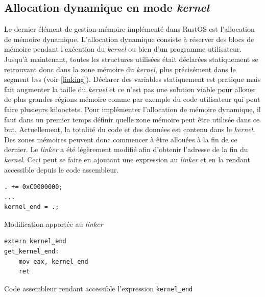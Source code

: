\subsection{Allocation dynamique en mode \textit{kernel}}
\label{alloc_kernel}
Le dernier élément de gestion mémoire implémenté dans RustOS est l'allocation de
mémoire dynamique. L'allocation dynamique consiste à réserver des blocs de mémoire
pendant l'exécution du \textit{kernel} ou bien d'un programme utilisateur. Jusqu'à
maintenant, toutes les structures utilisées était déclarées statiquement se retrouvant
donc dans la zone mémoire du \textit{kernel}, plus précisément dans le segment
bss (voir \ref{linking}). Déclarer des variables statiquement est pratique mais fait
augmenter la taille du \textit{kernel} et ce n'est pas une solution viable
pour allouer de plus grandes régions mémoire comme par exemple du code utilisateur
qui peut faire plusieurs kilooctets. Pour implémenter l'allocation de mémoire
dynamique, il faut dans un premier temps définir quelle zone mémoire peut être
utilisée dans ce but. Actuellement, la totalité du code et des données est contenu
dans le \textit{kernel}. Des zones mémoires peuvent donc commencer à être allouées
à la fin de ce dernier. Le \textit{linker} a été légèrement modifié afin d'obtenir
l'adresse de la fin du \textit{kernel}. Ceci peut se faire en ajoutant une expression
au \textit{linker} et en la rendant accessible depuis le code assembleur. \\

\begin{code}
\begin{verbatim}
. += 0xC0000000;
...
kernel_end = .;
\end{verbatim}
\caption{Modification apportée au \textit{linker}}
\label{lst:mem:alloc:linker}
\end{code} \bigbreak

\begin{code}
\begin{verbatim}
extern kernel_end
get_kernel_end:
    mov eax, kernel_end
    ret
\end{verbatim}
\caption{Code assembleur rendant accessible l'expression \texttt{kernel_end}}
\label{lst:mem:alloc:kernel_end}
\end{code} \bigbreak

